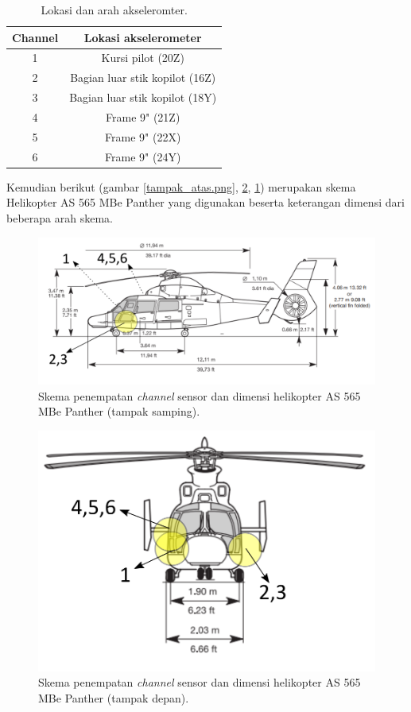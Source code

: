 \begin{longtable}{|c|c|}
	\caption{Lokasi dan arah akseleromter.}
	\label{tb:lokasiakselero}                        	\\
	\hline
	\textbf{Channel} & \textbf{Lokasi akselerometer} 	\\
	\hline
	1            	 & Kursi pilot (20Z)             	\\
	\hline
	2			     & Bagian luar stik kopilot (16Z)   \\
	\hline
	3				 & Bagian luar stik kopilot	(18Y)   \\
	\hline
	4				 & Frame 9" (21Z)                   \\
	\hline
	5				 & Frame 9" (22X)					\\
	\hline
	6				 & Frame 9" (24Y)					\\
	\hline
\end{longtable}

Kemudian berikut (gambar \ref{tampak_atas.png}, \ref{tampak_depan.png}, \ref{tampak_samping.png}) merupakan skema Helikopter AS 565 MBe Panther yang digunakan beserta keterangan dimensi dari beberapa arah skema.

\begin{figure}[H]
	\centering
	\includegraphics[width=0.8\linewidth]{gambar/tampak_samping.png}
	\caption{Skema penempatan \textit{channel} sensor dan dimensi helikopter AS 565 MBe Panther (tampak samping).}
	\label{tampak_samping.png}
\end{figure}

\begin{figure}[H]
	\centering
	\includegraphics[width=0.6\linewidth]{gambar/tampak_depan.png}
	\caption{Skema penempatan \textit{channel} sensor dan dimensi helikopter AS 565 MBe Panther (tampak depan).}
	\label{tampak_depan.png}
\end{figure}


